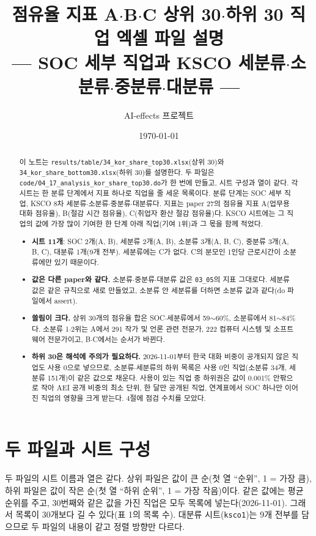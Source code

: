 \documentclass[11pt]{article}
\title{점유율 지표 A$\cdot$B$\cdot$C 상위 30$\cdot$하위 30 직업 엑셀 파일 설명\\[2mm]
\large --- SOC 세부 직업과 KSCO 세분류$\cdot$소분류$\cdot$중분류$\cdot$대분류 ---}
\author{AI-effects 프로젝트}
\date{\today}
\begin{document}
\maketitle

\begin{abstract}
\noindent 이 노트는 \texttt{results/table/34\_kor\_share\_top30.xlsx}(상위 30)와 \texttt{34\_kor\_share\_bottom30.xlsx}(하위 30)를 설명한다. 두 파일은 \texttt{code/04\_17\_analysis\_kor\_share\_top30.do}가 한 번에 만들고, 시트 구성과 열이 같다. 각 시트는 한 분류 단계에서 지표 하나로 직업을 줄 세운 목록이다. 분류 단계는 SOC 세부 직업, KSCO 8차 세분류$\cdot$소분류$\cdot$중분류$\cdot$대분류다. 지표는 paper 27의 점유율 지표 A(업무용 대화 점유율), B(절감 시간 점유율), C(취업자 환산 절감 점유율)다. KSCO 시트에는 그 직업의 값에 가장 많이 기여한 한 단계 아래 직업(기여 1위)과 그 몫을 함께 적었다.
\begin{itemize}[leftmargin=*]
  \item \textbf{시트 11개}: SOC 2개(A, B), 세분류 2개(A, B), 소분류 3개(A, B, C), 중분류 3개(A, B, C), 대분류 1개(9개 전부). 세분류에는 C가 없다. C의 분모인 1인당 근로시간이 소분류에만 있기 때문이다.
  \item \textbf{값은 다른 paper와 같다.} 소분류$\cdot$중분류$\cdot$대분류 값은 \texttt{03\_05}의 지표 그대로다. 세분류 값은 같은 규칙으로 새로 만들었고, 소분류 안 세분류를 더하면 소분류 값과 같다(do 파일에서 assert).
  \item \textbf{쏠림이 크다.} 상위 30개의 점유율 합은 SOC$\cdot$세분류에서 59$\sim$60\%, 소분류에서 81$\sim$84\%다. 소분류 1$\cdot$2위는 A에서 291 작가 및 언론 관련 전문가, 222 컴퓨터 시스템 및 소프트웨어 전문가이고, B$\cdot$C에서는 순서가 바뀐다.
  \item \textbf{하위 30은 해석에 주의가 필요하다.} 2026-11-01부터 한국 대화 비중이 공개되지 않은 직업도 사용 0으로 넣으므로, 소분류$\cdot$세분류의 하위 목록은 사용 0인 직업(소분류 34개, 세분류 151개)이 같은 값으로 채운다. 사용이 있는 직업 중 하위권은 값이 0.001\% 안팎으로 작아 AEI 공개 비중의 최소 단위, 한 달만 공개된 직업, 연계표에서 SOC 하나만 이어진 직업의 영향을 크게 받는다. 4절에 점검 수치를 모았다.
\end{itemize}
\end{abstract}

\section{두 파일과 시트 구성}

두 파일의 시트 이름과 열은 같다. 상위 파일은 값이 큰 순(첫 열 ``순위'', 1 = 가장 큼), 하위 파일은 값이 작은 순(첫 열 ``하위 순위'', 1 = 가장 작음)이다. 같은 값에는 평균 순위를 주고, 30번째와 같은 값을 가진 직업은 모두 목록에 넣는다(2026-11-01). 그래서 목록이 30개보다 길 수 있다(표 1의 목록 수). 대분류 시트(\texttt{ksco1})는 9개 전부를 담으므로 두 파일의 내용이 같고 정렬 방향만 다르다.
\end{document}
